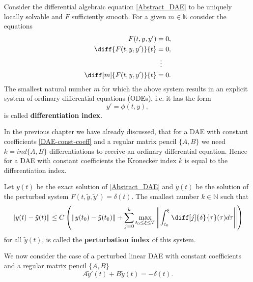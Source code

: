 \begin{definition}
	Consider the differential algebraic equation \eqref{Abstract_DAE} to be uniquely locally solvable and $F$ sufficiently smooth. For a given $m \in \mathbb{N}$ consider the equations
	\begin{displaymath}
		\begin{aligned}
			F(t,y,y') &= 0, \\
			\diff{F(t,y,y')}{t} &= 0, \\
			&\vdotswithin{=} \\
			\diff[m]{F(t,y,y')}{t} &= 0.
		\end{aligned}
	\end{displaymath}
	The smallest natural number $m$ for which the above system results in an explicit system of ordinary differential equations (ODEs), i.e. it has the form
	\begin{displaymath}
		y' = \phi(t,y),
	\end{displaymath}
	is called \textbf{differentiation index}.
\end{definition}

In the previous chapter we have already discussed, that for a DAE with constant coefficients \eqref{DAE-const-coeff} and a regular matrix pencil $\{A,B\}$  we need $k = ind\{A,B\}$ differentiations to receive an ordinary differential equation. Hence for a DAE with constant coefficients the Kronecker index $k$ is equal to the differentiation index.

\begin{definition}
	Let $y(t)$ be the exact solution of \eqref{Abstract_DAE} and $\tilde{y}(t)$ be the solution of the perturbed system $F(t, \tilde{y}, \tilde{y}') = \delta(t)$. The smallest number $k \in \mathbb{N}$ such that 
	\begin{displaymath}
		\|y(t)-\tilde{y}(t)\| \leq C \left(\|y(t_0)-\tilde{y}(t_0)\|+\sum_{j=0}^{k}\max_{t_0 \leq \xi \leq T} \left\rVert 		\int_{t_0}^{\xi}\diff[j]{\delta}{\tau}(\tau)d \tau \right\rVert \right)
	\end{displaymath}
	for all $\tilde{y}(t)$, is called the \textbf{perturbation index} of this system.
\end{definition}	

We now consider the case of a perturbed linear DAE with constant coefficients and a regular matrix pencil $\{A,B\}$
\begin{displaymath}
	A \tilde{y}'(t) + B \tilde{y}(t) = -\delta(t).
\end{displaymath}

